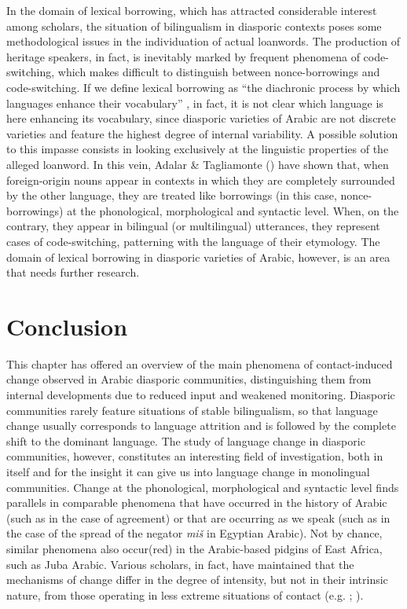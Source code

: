 \documentclass[output=paper]{langsci/langscibook}
\begin{document}
In the domain of lexical borrowing, which has attracted considerable interest among scholars, the situation of bilingualism in diasporic contexts poses some methodological issues in the individuation of actual loanwords. The production of heritage speakers, in fact, is inevitably marked by frequent phenomena of code-switching, which makes difficult to distinguish between nonce-borrowings \citep{Poplack1980} and code-switching. If we define lexical borrowing as “the diachronic process by which languages enhance their vocabulary” \citep[106]{Matras2009}, in fact, it is not clear which language is here enhancing its vocabulary, since diasporic varieties of Arabic are not discrete varieties and feature the highest degree of internal variability. A possible solution to this impasse consists in looking exclusively at the linguistic properties of the alleged loanword. In this vein, Adalar \& Tagliamonte (\citeyear[156]{AdalarTagliamonte1998}) have shown that, when foreign-origin nouns appear in contexts in which they are completely surrounded by the other language, they are treated like borrowings (in this case, nonce-borrowings) at the phonological, morphological and syntactic level. When, on the contrary, they appear in bilingual (or multilingual) utterances, they represent cases of code-switching, patterning with the language of their etymology. The domain of lexical borrowing in diasporic varieties of Arabic, however, is an area that needs further research.

\section{Conclusion}

This chapter has offered an overview of the main phenomena of contact-induced change observed in Arabic diasporic communities, distinguishing them from internal developments due to reduced input and weakened monitoring. Diasporic communities rarely feature situations of stable bilingualism, so that language change usually corresponds to language attrition and is followed by the complete shift to the dominant language. The study of language change in diasporic communities, however, constitutes an interesting field of investigation, both in itself and for the insight it can give us into language change in monolingual communities. Change at the phonological, morphological and syntactic level finds parallels in comparable phenomena that have occurred in the history of Arabic (such as in the case of agreement) or that are occurring as we speak (such as in the case of the spread of the negator \textit{miš} in Egyptian Arabic). Not by chance, similar phenomena also occur(red) in the Arabic-based pidgins of East Africa, such as Juba Arabic. Various scholars, in fact, have maintained that the mechanisms of change differ in the degree of intensity, but not in their intrinsic nature, from those operating in less extreme situations of contact (e.g. \citealt[8]{Miller2003}; \citealt[528]{Lucas2015}).
\end{document}
